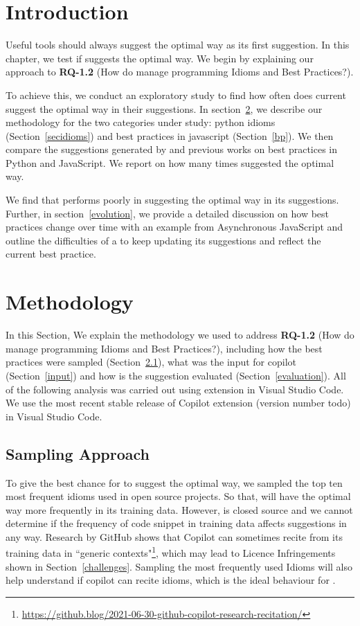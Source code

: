 \label{chapter:idioms}

\section{Introduction}
Useful \AISE{} tools should always suggest the optimal way as its first suggestion. In this chapter, we test if \cop{} suggests the optimal way. 
We begin by explaining our approach to \textbf{RQ-1.2} (How do \cct{} manage programming Idioms and Best Practices?). 

To achieve this, we conduct an exploratory study to find how often does current \cct{} suggest the optimal way in their suggestions. In section~\ref{methodology}, we describe our methodology for the two categories under study: python idioms (Section~\ref{secidioms}) and best practices in javascript (Section~\ref{bp}).
We then compare the suggestions generated by \cop{} and previous works on best practices in Python and JavaScript. We report on how many times \cop{} suggested the optimal way. 

We find that \cop{} performs poorly in suggesting the optimal way in its suggestions. Further, in section~\ref{evolution}, we provide a detailed discussion on how best practices change over time with an example from Asynchronous JavaScript and outline the difficulties of a \cct{} to keep updating its suggestions and reflect the current best practice.

\section{Methodology}
\label{methodology}
In this Section, We explain the methodology we used to address \textbf{RQ-1.2} (How do \cct{} manage programming Idioms and Best Practices?), including how the best practices were sampled (Section~\ref{sampling}), what was the input for copilot (Section~\ref{input}) and how is the suggestion evaluated (Section~\ref{evaluation}). All of the following analysis was carried out using \cop{} extension in Visual Studio Code. We use the most recent stable release of Copilot extension (version number todo) in Visual Studio Code.

\subsection{Sampling Approach}
\label{sampling}
To give the best chance for \cop{} to suggest the optimal way, we sampled the top ten most frequent idioms used in open source projects. So that, \cop{} will have the optimal way more frequently in its training data. However, \cop{} is closed source and we cannot determine if the frequency of code snippet in training data affects \cop{} suggestions in any way. Research by GitHub shows that Copilot can sometimes recite from its training data in ``generic contexts"\footnote{\url{https://github.blog/2021-06-30-github-copilot-research-recitation/}}, which may lead to Licence Infringements shown in Section~\ref{challenges}. Sampling the most frequently used Idioms will also help understand if copilot can recite idioms, which is the ideal behaviour for \cct{}.

